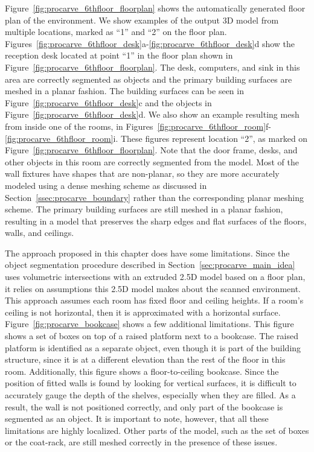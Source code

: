 \documentclass[12pt,onecolumn,oneside]{book}
\begin{document}
Figure~\ref{fig:procarve_6thfloor_floorplan} shows the automatically generated floor plan of the environment.  We show examples of the output 3D model from multiple locations, marked as ``1'' and ``2'' on the floor plan.  Figures~\ref{fig:procarve_6thfloor_desk}a-\ref{fig:procarve_6thfloor_desk}d show the reception desk located at point ``1'' in the floor plan shown in Figure~\ref{fig:procarve_6thfloor_floorplan}.  The desk, computers, and sink in this area are correctly segmented as objects and the primary building surfaces are meshed in a planar fashion.  The building surfaces can be seen in Figure~\ref{fig:procarve_6thfloor_desk}c and the objects in Figure~\ref{fig:procarve_6thfloor_desk}d.  We also show an example resulting mesh from inside one of the rooms, in Figures~\ref{fig:procarve_6thfloor_room}f-\ref{fig:procarve_6thfloor_room}i.  These figures represent location ``2'', as marked on Figure~\ref{fig:procarve_6thfloor_floorplan}.  Note that the door frame, desks, and other objects in this room are correctly segmented from the model.  Most of the wall fixtures have shapes that are non-planar, so they are more accurately modeled using a dense meshing scheme as discussed in Section~\ref{ssec:procarve_boundary} rather than the corresponding planar meshing scheme.  The primary building surfaces are still meshed in a planar fashion, resulting in a model that preserves the sharp edges and flat surfaces of the floors, walls, and ceilings.

The approach proposed in this chapter does have some limitations.  Since the object segmentation procedure described in Section~\ref{sec:procarve_main_idea} uses volumetric intersections with an extruded 2.5D model based on a floor plan, it relies on assumptions this 2.5D model makes about the scanned environment.  This approach assumes each room has fixed floor and ceiling heights.  If a room's ceiling is not horizontal, then it is approximated with a horizontal surface.  Figure~\ref{fig:procarve_bookcase} shows a few additional limitations.  This figure shows a set of boxes on top of a raised platform next to a bookcase.  The raised platform is identified as a separate object, even though it is part of the building structure, since it is at a different elevation than the rest of the floor in this room.  Additionally, this figure shows a floor-to-ceiling bookcase.  Since the position of fitted walls is found by looking for vertical surfaces, it is difficult to accurately gauge the depth of the shelves, especially when they are filled.  As a result, the wall is not positioned correctly, and only part of the bookcase is segmented as an object.  It is important to note, however, that all these limitations are highly localized.  Other parts of the model, such as the set of boxes or the coat-rack, are still meshed correctly in the presence of these issues.
\end{document}
